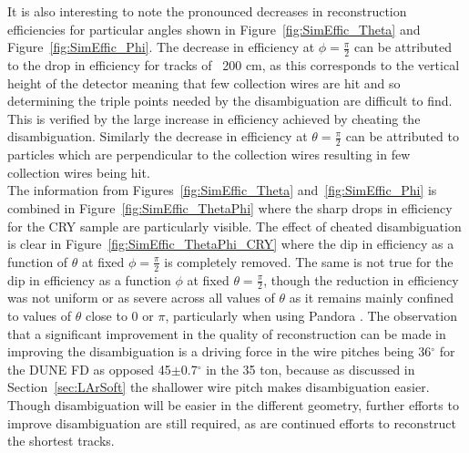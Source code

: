 It is also interesting to note the pronounced decreases in reconstruction efficiencies for particular angles shown in Figure~\ref{fig:SimEffic_Theta} and Figure~\ref{fig:SimEffic_Phi}. The decrease in efficiency at $\phi = \frac{\pi}{2}$ can be attributed to the drop in efficiency for tracks of ~200 cm, as this corresponds to the vertical height of the detector meaning that few collection wires are hit and so determining the triple points needed by the disambiguation are difficult to find. This is verified by the large increase in efficiency achieved by cheating the disambiguation. Similarly the decrease in efficiency at $\theta = \frac{\pi}{2}$ can be attributed to particles which are perpendicular to the collection wires resulting in few collection wires being hit. \\  

The information from Figures~\ref{fig:SimEffic_Theta} and~\ref{fig:SimEffic_Phi} is combined in Figure~\ref{fig:SimEffic_ThetaPhi} where the sharp drops in efficiency for the CRY sample are particularly visible. The effect of cheated disambiguation is clear in Figure~\ref{fig:SimEffic_ThetaPhi_CRY} where the dip in efficiency as a function of $\theta$ at fixed $\phi=\frac{\pi}{2}$ is completely removed. The same is not true for the dip in efficiency as a function $\phi$ at fixed $\theta = \frac{\pi}{2}$, though the reduction in efficiency was not uniform or as severe across all values of $\theta$ as it remains mainly confined to values of $\theta$ close to 0 or $\pi$, particularly when using Pandora . The observation that a significant improvement in the quality of reconstruction can be made in improving the disambiguation is a driving force in the wire pitches being 36$^{\circ}$ for the DUNE FD as opposed 45$\pm$0.7$^{\circ}$ in the 35 ton, because as discussed in Section~\ref{sec:LArSoft} the shallower wire pitch makes disambiguation easier. Though disambiguation will be easier in the different geometry, further efforts to improve disambiguation are still required, as are continued efforts to reconstruct the shortest tracks. \\

